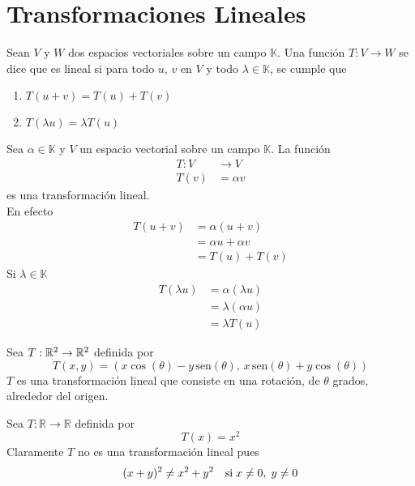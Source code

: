 \chapter{Transformaciones Lineales}

\begin{dfn}
Sean $V$ y $W$ dos espacios vectoriales sobre un campo $\mathbb{K}$. Una función $T: V \to W$ se dice que es lineal si para todo $u$, $v$ en $V$ y todo $\lambda \in \mathbb{K}$, se cumple que
\begin{enumerate}
\item $T (u+v) = T(u) + T(v)$
\item $T(\lambda u) = \lambda T(u)$
\end{enumerate}
\end{dfn}

\begin{ejemplo}
Sea $\alpha \in \mathbb{K}$ y $V$ un espacio vectorial sobre un campo $\mathbb{K}$. La función 
\begin{align*}
T: V &\to V\\
T(v) &= \alpha v
\end{align*}
es una transformación lineal.\\
En efecto 
\begin{align*}
T(u+v) &= \alpha (u+v)\\
&= \alpha u + \alpha v\\
&= T(u)+T(v)
\end{align*}
Si $\lambda \in \mathbb{K}$
\begin{align*}
T(\lambda u) &= \alpha (\lambda u)\\
&= \lambda (\alpha u)\\
&=\lambda T(u)
\end{align*}
\end{ejemplo}

\begin{ejemplo}
Sea $T: \mathbb{R}^2 \to \mathbb{R}^2$ definida por
$$T(x,y) = (x \cos(\theta) - y\, \mathrm{sen} (\theta) ,\, x\, \mathrm{sen}(\theta) + y \cos (\theta))$$
$T$ es una transformación lineal que consiste en una rotación, de $\theta$ grados, alrededor del origen.
\end{ejemplo}

\begin{ejemplo}
Sea $T: \mathbb{R} \to \mathbb{R}$ definida por 
$$T(x) = x^2$$
Claramente $T$ no es una transformación lineal pues
$$(x+y)^2 \neq x^2 + y^2  \ \ \ \textup{si} \; x\neq 0 ,\; y \neq 0$$
\end{ejemplo}

